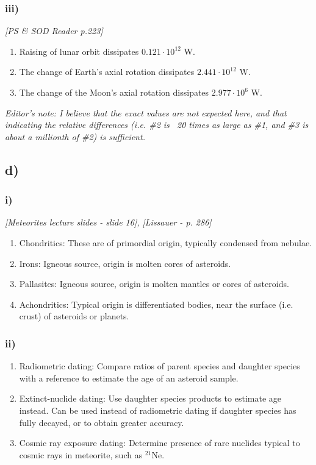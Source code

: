 \subsubsection*{iii)}
\textit{[PS \& SOD Reader p.223]}
\begin{enumerate}
    \item Raising of lunar orbit dissipates $0.121 \cdot 10^{12}$ W.
    \item The change of Earth's axial rotation dissipates $2.441 \cdot 10^{12}$ W.
    \item The change of the Moon's axial rotation dissipates $2.977 \cdot 10^{6}$ W.
\end{enumerate}

\textit{Editor's note: I believe that the exact values are not expected here, and that indicating the relative differences (i.e. \#2 is ~20 times as large as \#1, and \#3 is about a millionth of \#2) is sufficient.}


\subsection*{d)}
\subsubsection*{i)}
\textit{[Meteorites lecture slides - slide 16], [Lissauer - p. 286]}
\begin{enumerate}
    \item Chondritics: These are of primordial origin, typically condensed from nebulae.
    \item Irons: Igneous source, origin is molten cores of asteroids.
    \item Pallasites: Igneous source, origin is molten mantles or cores of asteroids.
    \item Achondritics: Typical origin is differentiated bodies, near the surface (i.e. crust) of asteroids or planets.
\end{enumerate}

\subsubsection*{ii)}
\begin{enumerate}
    \item Radiometric dating: Compare ratios of parent species and daughter species with a reference to estimate the age of an asteroid sample.
    \item Extinct-nuclide dating: Use daughter species products to estimate age instead. Can be used instead of radiometric dating if daughter species has fully decayed, or to obtain greater accuracy.
    \item Cosmic ray exposure dating: Determine presence of rare nuclides typical to cosmic rays in meteorite, such as $^{21}$Ne.
\end{enumerate}

